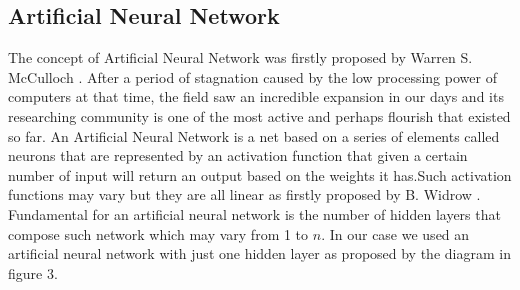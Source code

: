 \documentclass[twocolumn]{article}
\begin{document}
\subsection{Artificial Neural Network}
The concept of Artificial Neural Network was firstly proposed by Warren S. McCulloch \cite{mcculloch_logical_1943}.
After a period of stagnation caused by the low processing power of computers at that time, the field saw an incredible expansion in our days and its researching community is one of the most active and perhaps flourish that existed so far.
An Artificial Neural Network is a net based on a series of elements called neurons that are represented by an activation function that given a certain number of input will return an output based on the weights it has.Such activation functions may vary but they are all linear as firstly proposed by B. Widrow \cite{b._widrow_et_al._adaptive_}.
Fundamental for an artificial neural network is the number of hidden layers that compose such network which may vary from 1 to $n$. In our case we used an artificial neural network with just one hidden layer as proposed by the diagram in figure 3.


\label{neural net}
\end{document}
